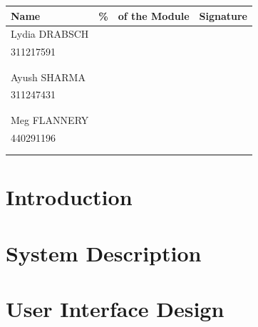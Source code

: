\documentclass[11pt,a4paper]{article}
\renewcommand{\thepage}{\roman{page}}
\renewcommand{\thepage}{\roman{page}}
\begin{document}
\begin{table}[h]
\centering
\begin{tabular}{|p{4cm}|p{0.75cm}|p{5cm}|p{4cm}|}
\hline Name & \% & of the Module & Signature\\
\hline Lydia DRABSCH & & &  \\
\cline{2-3} 311217591 & & & \\
\cline{2-3} & & & \\
\cline{2-3} & & & \\
\hline Ayush SHARMA& & & \\
\cline{2-3} 311247431 & & & \\
\cline{2-3} & & & \\
\cline{2-3} & & & \\
\hline Meg FLANNERY & & & \\
\cline{2-3} 440291196 & & & \\
\cline{2-3} & & & \\
\cline{2-3} & & & \\
\hline
\end{tabular}
\end{table}
\newpage

\tableofcontents
\listoffigures
\listoftables
\newpage
{}


\section{Introduction}



\section{System Description}











\section{User Interface Design}
\end{document}
